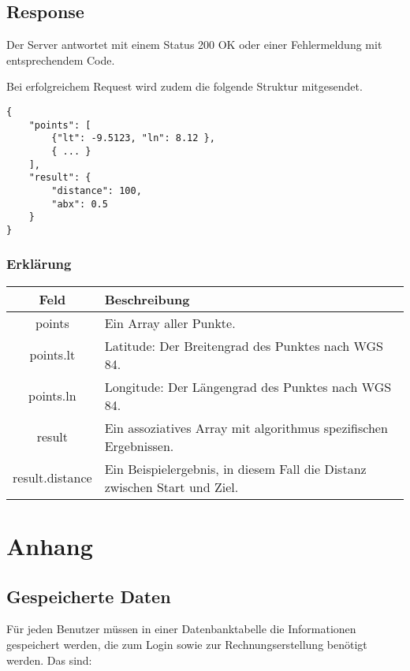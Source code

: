 \documentclass[ngerman]{scrartcl}
\begin{document}
	\subsection*{Response}
	
	Der Server antwortet mit einem Status 200 OK oder einer Fehlermeldung mit entsprechendem Code.
	
	Bei erfolgreichem Request wird zudem die folgende Struktur mitgesendet.
	
	\begin{lstlisting}
{
	"points": [
		{"lt": -9.5123, "ln": 8.12 },
		{ ... }
	],
	"result": {
		"distance": 100,
		"abx": 0.5
	}
}
	\end{lstlisting}
	
		\subsubsection*{Erklärung}
		
		\begin{tabular}{|c|p{12cm}|}
			\hline
			\textbf{Feld} & \textbf{Beschreibung} \\ 
			\hline \hline
			
			points & Ein Array aller Punkte.\\
			\hline
			
	    	points.lt & Latitude: Der Breitengrad des Punktes nach WGS 84. \\ 
	    	\hline
	    	
	    	points.ln & Longitude: Der Längengrad des Punktes nach WGS 84. \\
	    	\hline
	    	
	    	result & Ein assoziatives Array mit algorithmus spezifischen Ergebnissen. \\
	    	\hline
	    	
	    	result.distance & Ein Beispielergebnis, in diesem Fall die Distanz zwischen Start und Ziel.\\
	    	\hline
		\end{tabular}
	

\section{Anhang}

	\subsection{Gespeicherte Daten}
	
	Für jeden Benutzer müssen in einer Datenbanktabelle die Informationen gespeichert werden, die zum Login sowie zur Rechnungserstellung benötigt werden. 
	Das sind:
	
\end{document}
